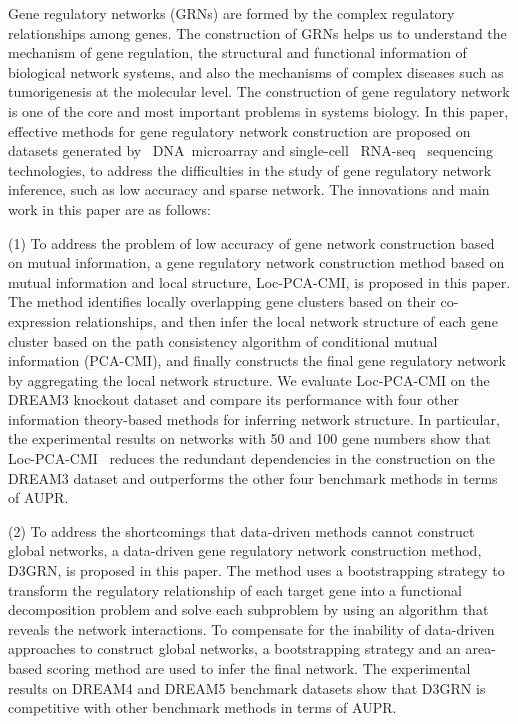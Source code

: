 \begin{abstracten}\setlength{\baselineskip}{20pt}

Gene regulatory networks (GRNs) are formed by the complex regulatory relationships among genes. 
The construction of GRNs helps us to understand the mechanism of gene regulation, the structural and functional information of biological network systems, and also the mechanisms of complex diseases such as tumorigenesis at the molecular level.
The construction of gene regulatory network is one of the core and most important problems in systems biology.
In this paper, effective methods for gene regulatory network construction are proposed on datasets generated by ~DNA~microarray and single-cell ~RNA-seq~ sequencing technologies, 
to address  the difficulties in the study of gene regulatory network inference, such as low accuracy and sparse network.
The innovations and main work in this paper are as follows:

(1) To address the problem of low accuracy of gene network construction based on mutual information, 
a gene regulatory network construction method based on mutual information and local structure, Loc-PCA-CMI, is proposed in this paper. 
The method identifies locally overlapping gene clusters based on their co-expression relationships, and then infer the local network structure of each gene cluster based on the path consistency algorithm of conditional mutual information (PCA-CMI), 
and finally constructs the final gene regulatory network by aggregating the local network structure.
We evaluate Loc-PCA-CMI on the DREAM3 knockout dataset and compare its performance with four other information theory-based methods for inferring network structure.
In particular, the experimental results on networks with 50 and 100 gene numbers show that Loc-PCA-CMI~ reduces the redundant dependencies 
in the construction on the DREAM3 dataset and outperforms the other four benchmark methods in terms of AUPR.

(2) To address the shortcomings that data-driven methods cannot construct global networks, 
a data-driven gene regulatory network construction method, D3GRN, is proposed in this paper. 
The method uses a bootstrapping strategy to transform the regulatory relationship of each target gene into a functional decomposition problem and solve each subproblem by using an algorithm that reveals the network interactions. 
To compensate for the inability of data-driven approaches to construct global networks, 
a bootstrapping strategy and an area-based scoring method are used to infer the final network. 
The experimental results on DREAM4 and DREAM5 benchmark datasets show that D3GRN is competitive with other benchmark methods in terms of AUPR.



\end{abstracten}
